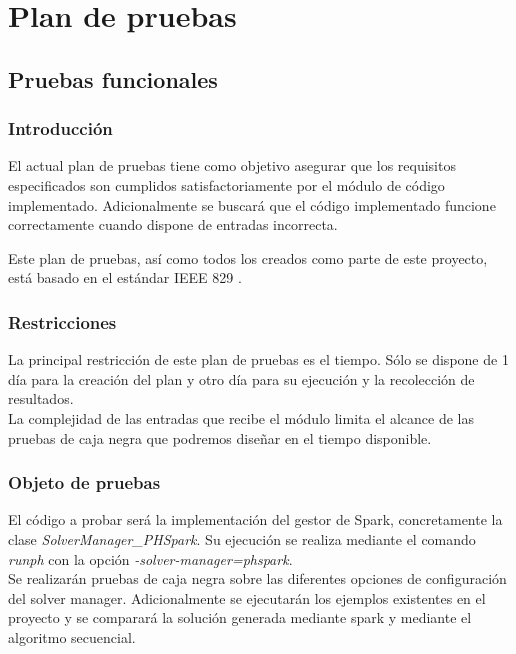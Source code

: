 \chapter{Plan de pruebas}
\label{sec:pruebas}

\section{Pruebas funcionales}

\subsection{Introducción}

El actual plan de pruebas tiene como objetivo asegurar que los requisitos especificados son cumplidos satisfactoriamente por el módulo de código implementado. Adicionalmente se buscará que el código implementado funcione correctamente cuando dispone de entradas incorrecta.

Este plan de pruebas, así como todos los creados como parte de este proyecto, está basado en el estándar IEEE 829 \cite{IEEE829}.

\subsection{Restricciones}

La principal restricción de este plan de pruebas es el tiempo. Sólo se dispone de 1 día para la creación del plan y otro día para su ejecución y la recolección de resultados.\\

La complejidad de las entradas que recibe el módulo limita el alcance de las pruebas de caja negra que podremos diseñar en el tiempo disponible.

\subsection{Objeto de pruebas}

El código a probar será la implementación del gestor de Spark, concretamente la clase {\it SolverManager\_PHSpark}. Su ejecución se realiza mediante el comando {\it runph} con la opción {\it -\-solver-manager=phspark}.\\

Se realizarán pruebas de caja negra sobre las diferentes opciones de configuración del solver manager. Adicionalmente se ejecutarán los ejemplos existentes en el proyecto y se comparará la solución generada mediante spark y mediante el algoritmo secuencial.

